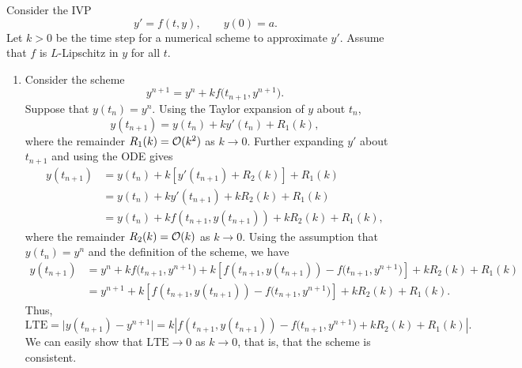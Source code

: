 \documentclass{homework}
\begin{document}
	\maketitle
	
	\question 
	
	Consider the IVP
	\begin{equation}
		\label{eq:ivp}
		y' = f(t,y), \qquad y(0) = a.
	\end{equation}
	Let $k > 0$ be the time step for a numerical scheme to approximate $y'$. Assume that $f$ is $L$-Lipschitz in $y$ for all $t$.
	
	\begin{enumerate}
		\item Consider the scheme
		\begin{equation}
			y^{n+1} = y^n + k f\big(t_{n+1}, y^{n+1}\big).
		\end{equation}
		Suppose that $y(t_n) = y^n$. Using the Taylor expansion of $y$ about $t_n$,
		\begin{equation*}
			y(t_{n+1}) = y(t_n) + ky'(t_n) + R_1(k),
		\end{equation*}
		where the remainder $R_1(k) = \mathcal{O}(k^2)$ as $k\to 0$.
		Further expanding $y'$ about $t_{n+1}$ and using the ODE gives
		\begin{align*}
			y(t_{n+1}) &= y(t_n) + k\left[y'(t_{n+1}) + R_2(k)\right] + R_1(k) \\
			&= y(t_n) + ky'(t_{n+1}) + kR_2(k) + R_1(k) \\
			&= y(t_n) + kf(t_{n+1}, y(t_{n+1})) + kR_2(k) + R_1(k),
		\end{align*}
		where the remainder $R_2(k) = \mathcal{O}(k)$ as $k \to 0$.
		Using the assumption that $y(t_n) = y^n$ and the definition of the scheme, we have
		\begin{align*}
			y(t_{n+1}) &= y^n + kf\big(t_{n+1}, y^{n+1}\big) + k\left[f(t_{n+1},y(t_{n+1})) - f\big(t_{n+1},y^{n+1}\big)\right] + kR_2(k) + R_1(k) \\
			&= y^{n+1} + k\left[f(t_{n+1},y(t_{n+1})) - f\big(t_{n+1},y^{n+1}\big)\right] + kR_2(k) + R_1(k).
		\end{align*}
		Thus,
		\begin{equation*}
			\text{LTE} = \big|y(t_{n+1}) - y^{n+1}\big| = k\left|f(t_{n+1},y(t_{n+1})) - f\big(t_{n+1},y^{n+1}\big) + kR_2(k) + R_1(k)\right|.
		\end{equation*}
		We can easily show that $\text{LTE} \to 0$ as $k\to 0$, that is, that the scheme is consistent.
		

\end{enumerate}
\end{document}
